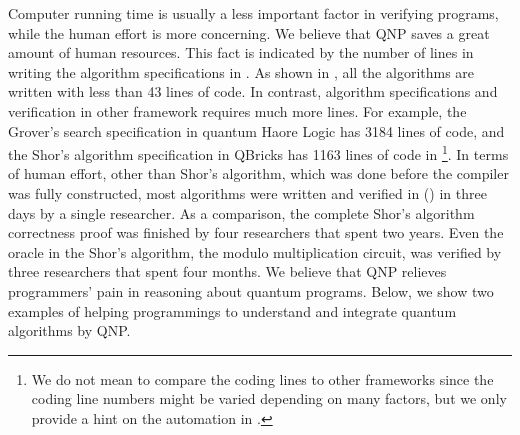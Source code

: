 Computer running time is usually a less important factor in verifying programs, while the human effort is more concerning. We believe that QNP saves a great amount of human resources. This fact is indicated by the number of lines in writing the algorithm specifications in \qafny. As shown in , all the algorithms are written with less than 43 lines of code.
In contrast, algorithm specifications and verification in other framework requires much more lines.
For example, the Grover's search specification in quantum Haore Logic \cite{qhoreusage} has 3184 lines of code, and the Shor's algorithm specification in QBricks \cite{qbricks} has 1163 lines of code in  \footnote{We do not mean to compare the coding lines to other frameworks since the coding line numbers might be varied depending on many factors, but we only provide a hint on the automation in \qafny.}.
In terms of human effort, other than Shor's algorithm, which was done before the \qafny compiler was fully constructed, most algorithms were written and verified in \qafny () in three days by a single researcher. 
As a comparison, the complete Shor's algorithm correctness proof \cite{shorsprove} was finished by four researchers that spent two years. Even the oracle in the Shor's algorithm, the modulo multiplication circuit, was verified by three researchers that spent four months. We believe that QNP relieves programmers' pain in reasoning about quantum programs.
Below, we show two examples of helping programmings to understand and integrate quantum algorithms by QNP.

